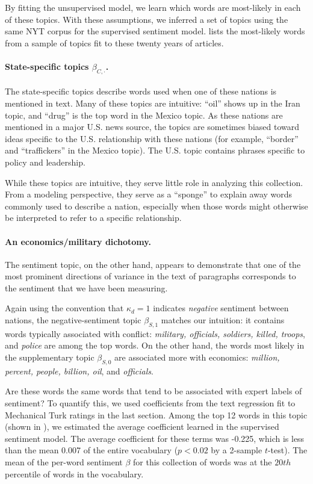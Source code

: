 By fitting the unsupervised model, we learn which words are
most-likely in each of these topics.  With these assumptions, we
inferred a set of topics using the same NYT corpus for the supervised
sentiment model.   lists the most-likely
words from a sample of topics fit to these twenty years of articles.

\paragraph{State-specific topics $\beta_{C,\cdot}$.}  The
state-specific topics describe words used when one of these nations
is mentioned in text.  Many of these topics are intuitive: ``oil''
shows up in the Iran topic, and ``drug'' is the top word in the Mexico
topic.  As these nations are mentioned in a major U.S. news source,
the topics are sometimes biased toward ideas specific to the
U.S. relationship with these nations (for example, ``border'' and
``traffickers'' in the Mexico topic).  The U.S. topic contains phrases
specific to policy and leadership.

While these topics are intuitive, they serve little role in analyzing
this collection.  From a modeling perspective, they serve as a
``sponge'' to explain away words commonly used to describe a nation,
especially when those words might otherwise be interpreted to refer to
a specific relationship.

\paragraph{An economics/military dichotomy.}
The sentiment topic, on the other hand, appears to demonstrate that
one of the most prominent directions of variance in the text of
paragraphs corresponds to the sentiment that we have been measuring.

Again using the convention that $\kappa_d=1$ indicates \emph{negative}
sentiment between nations, the negative-sentiment topic
$\beta_{S,1}$ matches our intuition: it contains words typically
associated with conflict: \emph{military, officials, soldiers, killed,
  troops}, and \emph{police} are among the top words. On the other
hand, the words most likely in the supplementary topic $\beta_{S,0}$
are associated more with economics: \emph{million, percent, people,
  billion, oil}, and \emph{officials}.

Are these words the same words that tend to be associated with expert
labels of sentiment?  To quantify this, we used
coefficients from the text regression fit to Mechanical Turk ratings
in the last section.  Among the top 12 words in this topic (shown in
), we estimated the average coefficient
learned in the supervised sentiment model.  The average coefficient
for these terms was -0.225, which is less than the mean 0.007 of the
entire vocabulary ($p < 0.02$ by a 2-sample $t$-test).  The mean of
the per-word sentiment $\beta$ for this collection of words was at the
$20th$ percentile of words in the vocabulary.

